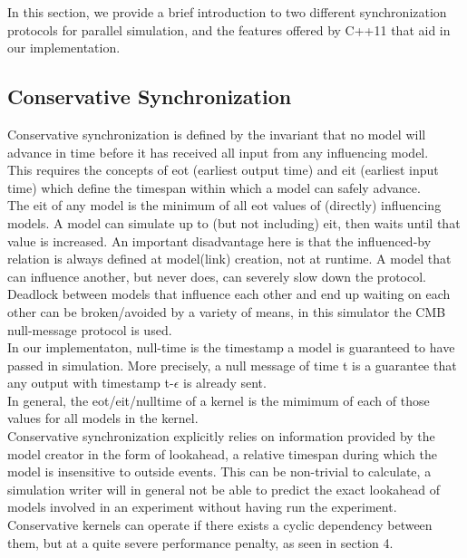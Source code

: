 In this section, we provide a brief introduction to two different synchronization protocols for parallel simulation, and the features offered by C++11 that aid in our implementation.

\subsection{Conservative Synchronization}
Conservative synchronization is defined by the invariant that no model will advance in time before it has received all input from any influencing model. \\
This requires the concepts of eot (earliest output time) and eit (earliest input time) which define the timespan within which a model can safely advance. \\ The eit of any model is the minimum of all eot values of (directly) influencing models. A model can simulate up to (but not including) eit, then waits until that value is increased. An important disadvantage here is that the influenced-by relation is always defined at model(link) creation, not at runtime. A model that can influence another, but never does, can severely slow down the protocol.\\ 
Deadlock between models that influence each other and end up waiting on each other can be broken/avoided by a variety of
means, in this simulator the CMB \cite{Chandy:1981:ADS:358598.358613} null-message protocol is used. \\
In our implementaton, null-time is the timestamp a model is guaranteed to have passed in simulation. More precisely, a null message of time t is a guarantee that any output with timestamp t-$\epsilon$ is already sent.\\
In general, the eot/eit/nulltime of a kernel is the mimimum of each of those values for all models in the kernel.\\
Conservative synchronization explicitly relies on information provided by the model creator in the form of lookahead, a relative timespan during which the model is insensitive to outside events. This can be non-trivial to calculate, a simulation writer will in general not be able to predict the exact lookahead of models involved in an experiment without having run the experiment.\\ Conservative kernels can operate if there exists a cyclic dependency between them, but at a quite severe performance penalty, as seen in section 4.
